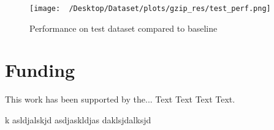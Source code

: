 \documentclass{bioinfo}
\begin{document}
\begin{figure}[!thbp]
\texttt{[image: ~/Desktop/Dataset/plots/gzip\_res/test\_perf.png]}
\caption{Performance on test dataset compared to baseline}\label{fig:01}
\end{figure}





\lipsum[1]

\section*{Funding}

This work has been supported by the... Text Text  Text Text.

k
asldjalskjd
asdjaskldjas
daklsjdalksjd
\end{document}

